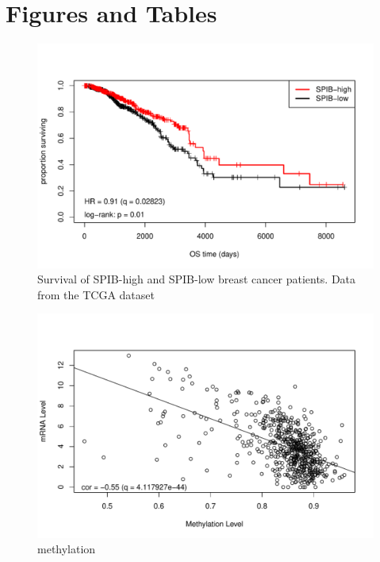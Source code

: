 \section{Figures and Tables}

\begin{figure}[h!]
    \centering
    \includegraphics[scale=0.75]{figures/km_plot.pdf}
    \caption{Survival of SPIB-high and SPIB-low breast cancer patients. Data from the TCGA dataset \cite{Ciriello2015, Goldman2018}}
    \label{km_plot}
\end{figure} 

\begin{figure}[h!]
    \centering
    \includegraphics[scale=0.75]{figures/methylation.pdf}
    \caption{methylation \cite{Ciriello2015, Goldman2018}}
    \label{methylation}
\end{figure} 

